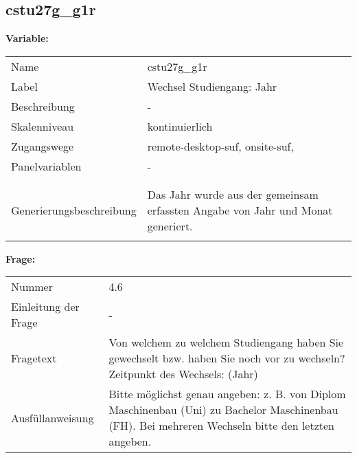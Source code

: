 	
	
	\subsection{cstu27g\_g1r}
	\label{subSection:cstu27g_g1r}

	\noindent\textbf{Variable:}\\
		\begin{tabular}{lL{11.3cm}}
			\label{tableVariable:cstu27g_g1r}
			Name & cstu27g\_g1r \\
			Label & Wechsel Studiengang: Jahr \\
			Beschreibung & - \\
			Skalenniveau & kontinuierlich \\
			Zugangswege &
				remote-desktop-suf,
				onsite-suf,
 \\
			Panelvariablen & -
			 \\
			 \\
 \\
					Generierungsbeschreibung & Das Jahr wurde aus der gemeinsam erfassten Angabe von Jahr und Monat generiert. 
				 \\	
			 \\
		\end{tabular}

		\vspace*{1 cm}
		\noindent\textbf{Frage:}\\
		\begin{tabular}{lL{11.3cm}}
			\label{tableQuestion:cstu27g_g1r}
			Nummer & 4.6 \\
			Einleitung der Frage & - \\
			Fragetext & Von welchem zu welchem Studiengang haben Sie gewechselt bzw. haben Sie noch vor zu wechseln?
Zeitpunkt des Wechsels:
(Jahr) \\
			Ausfüllanweisung & Bitte möglichst genau angeben: z. B. von Diplom Maschinenbau
(Uni) zu Bachelor Maschinenbau (FH).
Bei mehreren Wechseln bitte den letzten angeben. \\
		\end{tabular}




